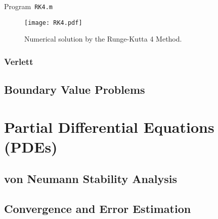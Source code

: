\begin{listing}[ht!]
	\tiny
	\centering
	\caption{Program~\texttt{RK4.m}}
	\label{code:RK2.m}
\end{listing}

\begin{figure}[ht!]
	\centering
	\texttt{[image: RK4.pdf]}
	\caption{Numerical solution by the Runge-Kutta 4 Method.}
\end{figure}

\subsubsection{Verlett}

\subsection{Boundary Value Problems}

\section{Partial Differential Equations (PDEs)}

\subsection{von Neumann Stability Analysis}

\subsection{Convergence and Error Estimation}
